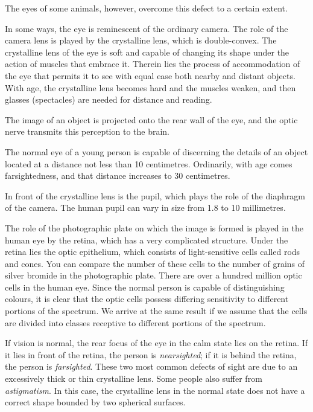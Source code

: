 The eyes of some animals, however, overcome this defect to a certain extent.

In some ways, the eye is reminescent of the ordinary camera. The role of the camera lens is played by the crystalline lens, which is double-convex. The crystalline lens of the eye is soft and capable of changing its shape under the action of muscles that embrace it. Therein lies the process of accommodation of the eye that permits it to see with equal ease both nearby and distant objects. With age, the crystalline lens becomes hard and the muscles weaken, and then glasses (spectacles) are needed for distance and reading.

The image of an object is projected onto the rear wall of the eye, and the optic nerve transmits this perception to the brain.

The normal eye of a young person is capable of discerning the details of an object located at a distance not less than 10 centimetres. Ordinarily, with age comes farsight­edness, and that distance increases to 30 centimetres.

In front of the crystalline lens is the pupil, which plays the role of the diaphragm of the camera. The human pupil can vary in size from 1.8 to 10 millimetres.

The role of the photographic plate on which the image is formed is played in the human eye by the retina, which has a very complicated structure. Under the retina lies the optic epithelium, which consists of light-sensitive cells called rods and cones. You can compare the number of these cells to the number of grains of silver bromide in the photographic plate. There are over a hundred million optic cells in the human eye. Since the normal person is capable of distinguishing colours, it is clear that the optic cells possess differing sensitivity to different portions of the spectrum. We arrive at the same result if we assume that the cells are divided into classes recep­tive to different portions of the spectrum.

If vision is normal, the rear focus of the eye in the calm state lies on the retina. If it lies in front of the retina, the person is \emph{nearsighted}; if it is behind the retina, the person is \emph{farsighted}. These two most common defects of sight are due to an excessively thick or thin crystalline lens. Some people also suffer from \emph{astigmatism}. In this case, the crystalline lens in the normal state does not have a correct shape bounded by two spherical surfaces.

